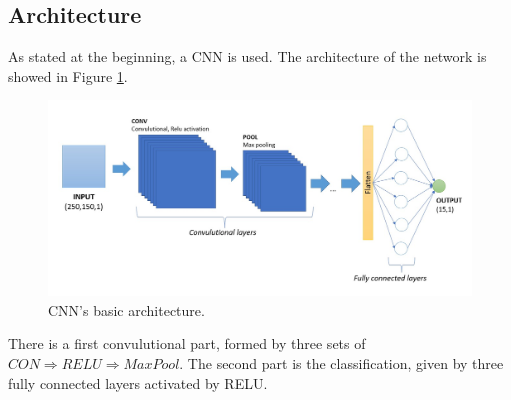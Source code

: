 \subsection{Architecture}
As stated at the beginning, a CNN is used. The architecture of the network is showed in Figure \ref{fig:BasicArch}.\\
\begin{figure}[h!]
	\centering
	\includegraphics[width=0.6\linewidth]{./ImageFiles/CNN/BasicArch}
	\caption{CNN's basic architecture.}
	\label{fig:BasicArch}
\end{figure}
There is a first convulutional part, formed by three sets of $CON \Rightarrow RELU \Rightarrow MaxPool$. The second part is the classification, given by three fully connected layers activated by RELU.